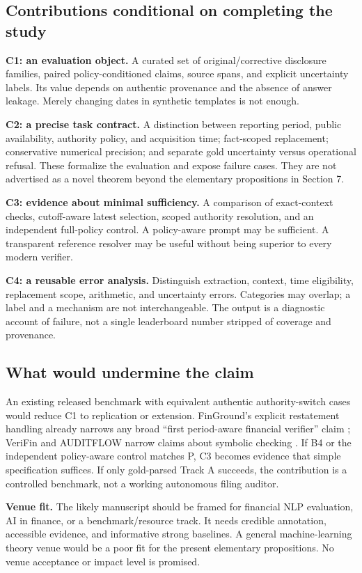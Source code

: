 \documentclass[11pt,a4paper]{article}
\newcommand{\lead}[1]{\textbf{\color{navy}#1}}
\begin{document}
\subsection{Contributions conditional on completing the study}
\lead{C1: an evaluation object.} A curated set of original/corrective disclosure families, paired policy-conditioned claims, source spans, and explicit uncertainty labels. Its value depends on authentic provenance and the absence of answer leakage. Merely changing dates in synthetic templates is not enough.

\lead{C2: a precise task contract.} A distinction between reporting period, public availability, authority policy, and acquisition time; fact-scoped replacement; conservative numerical precision; and separate gold uncertainty versus operational refusal. These formalize the evaluation and expose failure cases. They are not advertised as a novel theorem beyond the elementary propositions in Section 7.

\lead{C3: evidence about minimal sufficiency.} A comparison of exact-context checks, cutoff-aware latest selection, scoped authority resolution, and an independent full-policy control. A policy-aware prompt may be sufficient. A transparent reference resolver may be useful without being superior to every modern verifier.

\lead{C4: a reusable error analysis.} Distinguish extraction, context, time eligibility, replacement scope, arithmetic, and uncertainty errors. Categories may overlap; a label and a mechanism are not interchangeable. The output is a diagnostic account of failure, not a single leaderboard number stripped of coverage and provenance.

\subsection{What would undermine the claim}
An existing released benchmark with equivalent authentic authority-switch cases would reduce C1 to replication or extension. FinGround's explicit restatement handling already narrows any broad “first period-aware financial verifier” claim \cite{finground}; VeriFin and AUDITFLOW narrow claims about symbolic checking \cite{verifin,auditflow}. If B4 or the independent policy-aware control matches P, C3 becomes evidence that simple specification suffices. If only gold-parsed Track A succeeds, the contribution is a controlled benchmark, not a working autonomous filing auditor.

\lead{Venue fit.} The likely manuscript should be framed for financial NLP evaluation, AI in finance, or a benchmark/resource track. It needs credible annotation, accessible evidence, and informative strong baselines. A general machine-learning theory venue would be a poor fit for the present elementary propositions. No venue acceptance or impact level is promised.
\end{document}
